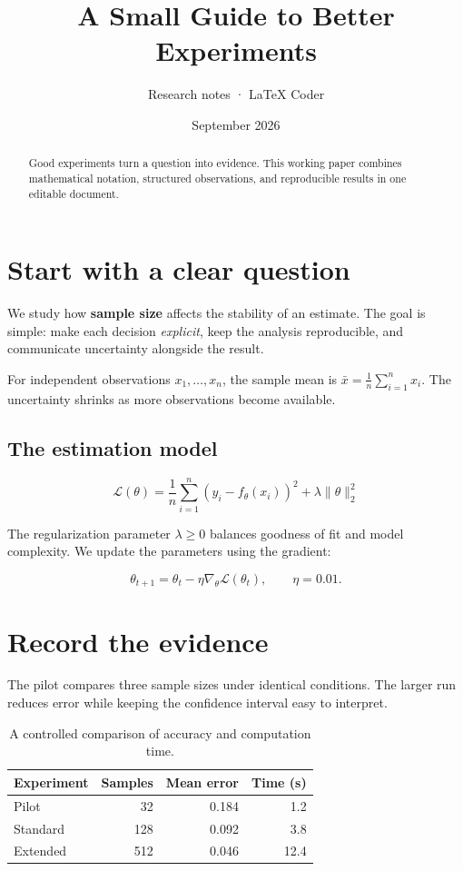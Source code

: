 \documentclass[11pt]{article}
\title{A Small Guide to Better Experiments}
\author{Research notes · LaTeX Coder}
\date{September 2026}
\begin{document}
\maketitle

\begin{abstract}
Good experiments turn a question into evidence. This working paper combines mathematical notation, structured observations, and reproducible results in one editable document.
\end{abstract}

\section{Start with a clear question}
We study how \textbf{sample size} affects the stability of an estimate. The goal is simple: make each decision \emph{explicit}, keep the analysis reproducible, and communicate uncertainty alongside the result.

For independent observations $x_1,\ldots,x_n$, the sample mean is $\bar{x}=\frac{1}{n}\sum_{i=1}^{n}x_i$. The uncertainty shrinks as more observations become available.

\subsection{The estimation model}
\begin{equation}
\mathcal{L}(\theta)=\frac{1}{n}\sum_{i=1}^{n}\left(y_i-f_\theta(x_i)\right)^2+\lambda\lVert\theta\rVert_2^2
\end{equation}

The regularization parameter $\lambda\geq 0$ balances goodness of fit and model complexity. We update the parameters using the gradient:

\[
\theta_{t+1}=\theta_t-\eta\nabla_\theta\mathcal{L}(\theta_t),\qquad \eta=0.01.
\]

\section{Record the evidence}
The pilot compares three sample sizes under identical conditions. The larger run reduces error while keeping the confidence interval easy to interpret.

\begin{table}[ht]
\centering
\begin{tabular}{lrrr}
\toprule
\textbf{Experiment} & \textbf{Samples} & \textbf{Mean error} & \textbf{Time (s)} \\
\midrule
Pilot & 32 & 0.184 & 1.2 \\
Standard & 128 & 0.092 & 3.8 \\
Extended & 512 & 0.046 & 12.4 \\
\bottomrule
\end{tabular}
\caption{A controlled comparison of accuracy and computation time.}
\end{table}
\end{document}
